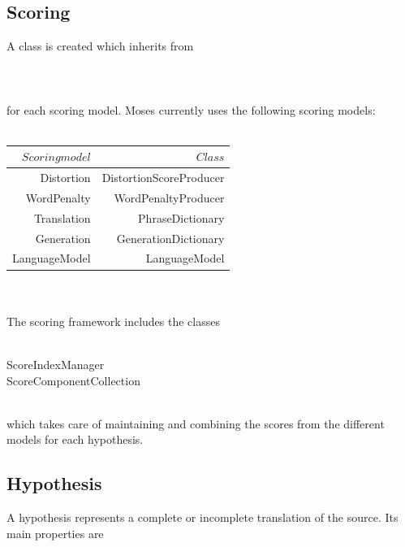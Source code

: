 \documentclass[11pt]{book}
\theoremstyle{plain}
\begin{document}
\subsection{Scoring}
A class is created which inherits from\\
\\
\\
\\
for each scoring model. Moses currently uses the following scoring models:\\
\\
\begin{tabular}{|r|r|}
\hline
$ Scoring model $&$ Class $\\
\hline
Distortion	& DistortionScoreProducer\\
WordPenalty	& WordPenaltyProducer\\
Translation	& PhraseDictionary\\
Generation	& GenerationDictionary\\
LanguageModel	& LanguageModel\\
\hline
\end{tabular}\\
\\
The scoring framework includes the classes \\
\\
\begin{tt}
\indent ScoreIndexManager\\
\indent	ScoreComponentCollection\\
\end{tt}
\\
which takes care of maintaining and combining the scores from the different models for each hypothesis.
\subsection{Hypothesis}
A hypothesis represents a complete or incomplete translation of the source. Its main properties are\\
\end{document}
